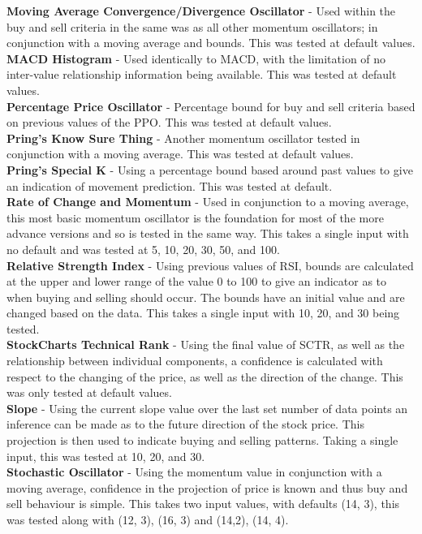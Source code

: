 \documentclass[conference]{IEEEtran}
\begin{document}
\textbf{Moving Average Convergence/Divergence Oscillator} - Used within the buy and sell criteria in the same was as all other momentum oscillators; in conjunction with a moving average and bounds. This was tested at default values.\\
\textbf{MACD Histogram} - Used identically to MACD, with the limitation of no inter-value relationship information being available. This was tested at default values. \\
\textbf{Percentage Price Oscillator} - Percentage bound for buy and sell criteria based on previous values of the PPO. This was tested at default values.\\
\textbf{Pring's Know Sure Thing} - Another momentum oscillator tested in conjunction with a moving average. This was tested at default values.\\
\textbf{Pring's Special K} - Using a percentage bound based around past values to give an indication of movement prediction. This was tested at default. \\
\textbf{Rate of Change and Momentum} - Used in conjunction to a moving average, this most basic momentum oscillator is the foundation for most of the more advance versions and so is tested in the same way. This takes a single input with no default and was tested at 5, 10, 20, 30, 50, and 100.\\
\textbf{Relative Strength Index} - Using previous values of RSI, bounds are calculated at the upper and lower range of the value 0 to 100 to give an indicator as to when buying and selling should occur. The bounds have an initial value and are changed based on the data. This takes a single input with 10, 20, and 30 being tested.\\
\textbf{StockCharts Technical Rank} - Using the final value of SCTR, as well as the relationship between individual components, a confidence is calculated with respect to the changing of the price, as well as the direction of the change. This was only tested at default values. \\
\textbf{Slope} - Using the current slope value over the last set number of data points an inference can be made as to the future direction of the stock price. This projection is then used to indicate buying and selling patterns. Taking a single input, this was tested at 10, 20, and 30.\\
\textbf{Stochastic Oscillator} - Using the momentum value in conjunction with a moving average, confidence in the projection of price is known and thus buy and sell behaviour is simple. This takes two input values, with defaults (14, 3), this was tested along with (12, 3), (16, 3) and (14,2), (14, 4).\\
\end{document}
